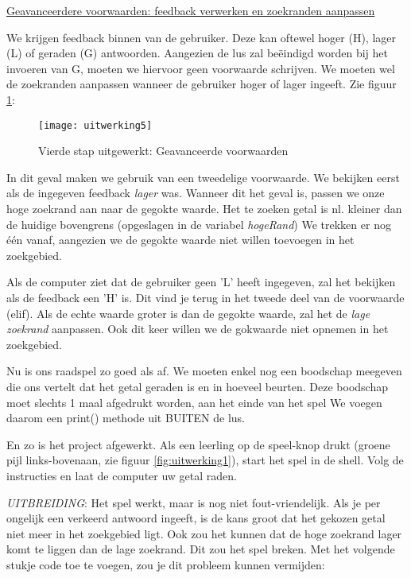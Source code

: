 \underline{Geavanceerdere voorwaarden: feedback verwerken en zoekranden aanpassen}

We krijgen feedback binnen van de gebruiker. Deze kan oftewel hoger (H), lager (L) of geraden (G) antwoorden. Aangezien de lus zal beëindigd worden bij het invoeren van G, moeten we hiervoor geen voorwaarde schrijven. We moeten wel de zoekranden aanpassen wanneer de gebruiker hoger of lager ingeeft. Zie figuur \ref{fig:uitwerking5}:

\begin{figure}
    \texttt{[image: uitwerking5]}
    \caption{Vierde stap uitgewerkt: Geavanceerde voorwaarden}
    \label{fig:uitwerking5}
\end{figure}

In dit geval maken we gebruik van een tweedelige voorwaarde. We bekijken eerst als de ingegeven feedback \emph{lager} was. Wanneer dit het geval is, passen we onze hoge zoekrand aan naar de gegokte waarde. Het te zoeken getal is nl. kleiner dan de huidige bovengrens (opgeslagen in de variabel \emph{hogeRand})
We trekken er nog één vanaf, aangezien we de gegokte waarde niet willen toevoegen in het zoekgebied.

Als de computer ziet dat de gebruiker geen 'L' heeft ingegeven, zal het bekijken als de feedback een 'H' is. Dit vind je terug in het tweede deel van de voorwaarde (elif). Als de echte waarde groter is dan de gegokte waarde, zal het de \emph{lage zoekrand} aanpassen. Ook dit keer willen we de gokwaarde niet opnemen in het zoekgebied.

Nu is ons raadspel zo goed als af. We moeten enkel nog een boodschap meegeven die ons vertelt dat het getal geraden is en in hoeveel beurten. Deze boodschap moet slechts 1 maal afgedrukt worden, aan het einde van het spel
We voegen daarom een print() methode uit BUITEN de lus.

En zo is het project afgewerkt. Als een leerling op de speel-knop drukt (groene pijl links-bovenaan, zie figuur \ref{fig:uitwerking1}), start het spel in de shell. Volg de instructies en laat de computer uw getal raden.

\emph{UITBREIDING}: Het spel werkt, maar is nog niet fout-vriendelijk. Als je per ongelijk een verkeerd antwoord ingeeft, is de kans groot dat het gekozen getal niet meer in het zoekgebied ligt. Ook zou het kunnen dat de hoge zoekrand lager komt te liggen dan de lage zoekrand. Dit zou het spel breken. Met het volgende stukje code toe te voegen, zou je dit probleem kunnen vermijden:


